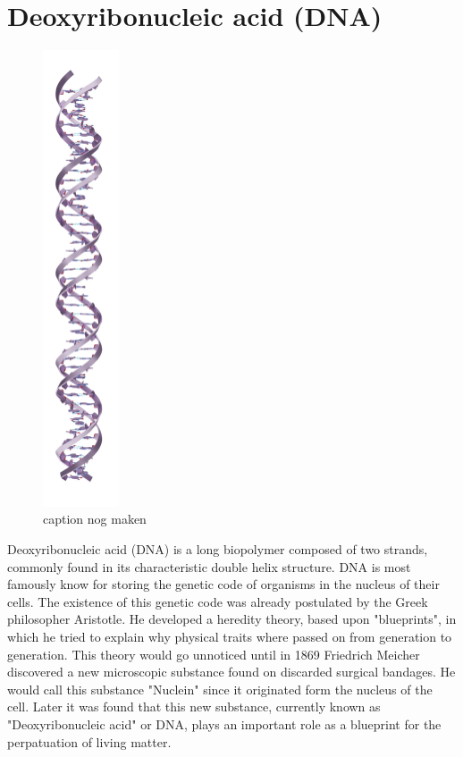 \section{Deoxyribonucleic acid (DNA)}

\begin{figure}
  \begin{center}
    \includegraphics[width=0.20\textwidth]{Figures/DNA1.png}
  \end{center}
  \caption{caption nog maken}
\end{figure}

Deoxyribonucleic acid (DNA) is a long biopolymer composed of two strands, commonly found
in its characteristic double helix structure. DNA is most famously know for storing the
genetic code of organisms in the nucleus of their cells. The existence of this genetic
code was already
postulated by the Greek philosopher Aristotle. He developed a heredity theory, based
upon "blueprints", in which he tried to explain why physical traits where passed on from
generation to generation. This theory would go unnoticed until in 1869
Friedrich Meicher discovered a new microscopic substance found on discarded
surgical bandages. He would call this substance "Nuclein" since it originated
form the nucleus of the cell. Later it was found that this new substance, currently known
as "Deoxyribonucleic acid" or DNA, plays an important role as a blueprint for the
perpatuation of living matter.

